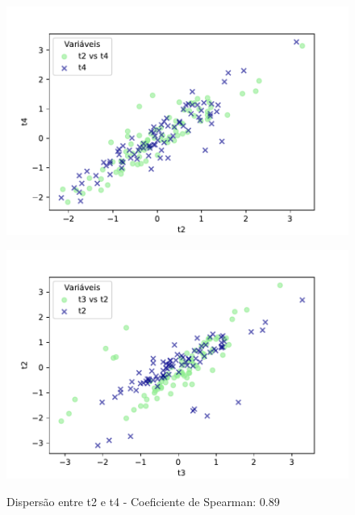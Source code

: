 \begin{figure}[h]
    \captionsetup{font=footnotesize, justification=centering, labelsep=period, position=above}
    \centering
    \begin{minipage}[b]{0.45\linewidth}
        \label{fig:t2-t4}
        \centering
        \includegraphics[scale=0.49]{figuras/Spearman/t2-t4.pdf}
        \caption{Dispersão entre t2 e t4 - Coeficiente de Spearman: 0.89}
        \vspace{0.3cm}
        \begin{minipage}{\linewidth}
            \centering
        \end{minipage}
    \end{minipage}
    \hspace{0.05\linewidth}
    \begin{minipage}[b]{0.45\linewidth}
        \label{fig:t3-t2}
        \centering
        \includegraphics[scale=0.35]{figuras/Spearman/t3-t2.pdf}

\end{minipage}
\end{figure}
